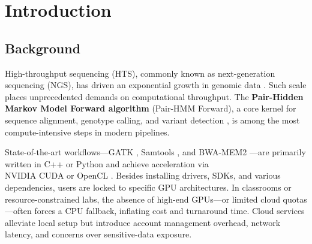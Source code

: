\documentclass[PhD]{PHlab-thesis}
\begin{document}



\printnomenclature[5cm]

\newpage
\setcounter{page}{1}

\chapter{Introduction}

\section{Background}
High-throughput sequencing (HTS), commonly known as next-generation sequencing (NGS), has driven an exponential growth in genomic data \cite{Mardis2017}. Such scale places unprecedented demands on computational throughput.  
The \textbf{Pair-Hidden Markov Model Forward algorithm} (Pair-HMM Forward), a core kernel for sequence alignment, genotype calling, and variant detection \cite{Durbin1998}, is among the most compute-intensive steps in modern pipelines.

State-of-the-art workflows—GATK \cite{McKenna2010}, Samtools \cite{Li2009}, and BWA-MEM2 \cite{Vasimuddin2019}—are primarily written in C++ or Python and achieve acceleration via \\ NVIDIA CUDA or OpenCL \cite{Liu2021-bib,Banerjee2017}. Besides installing drivers, SDKs, and various dependencies, users are locked to specific GPU architectures. In classrooms or resource-constrained labs, the absence of high-end GPUs—or limited cloud quotas—often forces a CPU fallback, inflating cost and turnaround time.  
Cloud services alleviate local setup but introduce account management overhead, network latency, and concerns over sensitive-data exposure.
\end{document}
